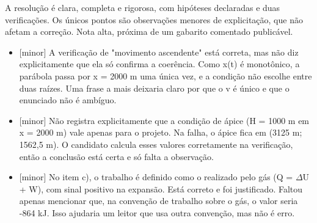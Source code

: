 \documentclass{article}%
\begin{document}
A resolução é clara, completa e rigorosa, com hipóteses declaradas e duas verificações. Os únicos pontos são observações menores de explicitação, que não afetam a correção. Nota alta, próxima de um gabarito comentado publicável.%
\begin{itemize}%
\item%
{[}minor{]} A verificação de "movimento ascendente" está correta, mas não diz explicitamente que ela só confirma a coerência. Como x(t) é monotônico, a parábola passa por x = 2000 m uma única vez, e a condição não escolhe entre duas raízes. Uma frase a mais deixaria claro por que o v é único e que o enunciado não é ambíguo.%
\item%
{[}minor{]} Não registra explicitamente que a condição de ápice (H = 1000 m em x = 2000 m) vale apenas para o projeto. Na falha, o ápice fica em (3125 m; 1562,5 m). O candidato calcula esses valores corretamente na verificação, então a conclusão está certa e só falta a observação.%
\item%
{[}minor{]} No item c), o trabalho é definido como o realizado pelo gás (Q = $\Delta$U + W), com sinal positivo na expansão. Está correto e foi justificado. Faltou apenas mencionar que, na convenção de trabalho sobre o gás, o valor seria -864 kJ. Isso ajudaria um leitor que usa outra convenção, mas não é erro.%
\end{itemize}%
\end{document}
